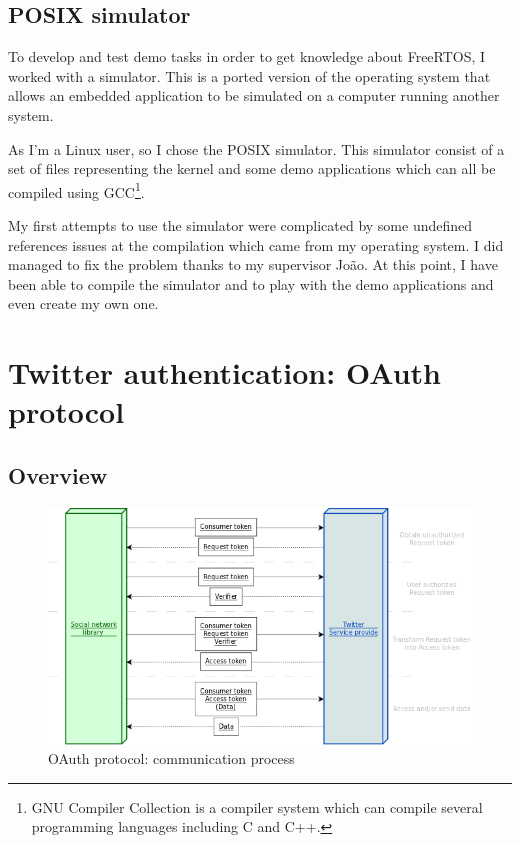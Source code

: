 \subsection{POSIX simulator}

\hspace{15mm}To develop and test demo tasks in order to get knowledge about FreeRTOS, I worked with a simulator. This is a ported version of the operating system that allows an embedded application to be simulated on a computer running another system.

As I'm a Linux user, so I chose the POSIX simulator. This simulator consist of a set of files representing the kernel and some demo applications which can all be compiled using GCC\footnote{GNU Compiler Collection is a compiler system which can compile several programming languages including C and C++.}.

My first attempts to use the simulator were complicated by some undefined references issues at the compilation which came from my operating system. I did managed to fix the problem thanks to my supervisor Jo\~{a}o. At this point, I have been able to compile the simulator and to play with the demo applications and even create my own one.



\section{Twitter authentication: OAuth protocol}

\subsection{Overview}


\begin{figure}[h]
  \centering
  \includegraphics[scale=0.75]{images/oauth.png}
  \caption{OAuth protocol: communication process}
\end{figure}


